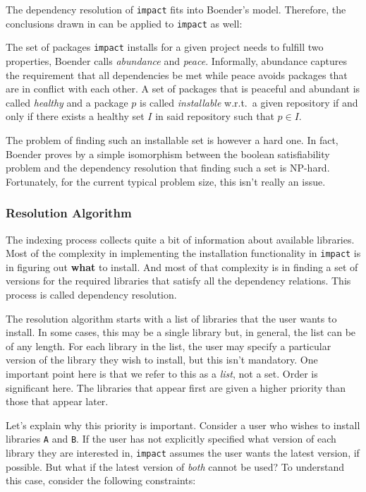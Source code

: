 \documentclass[11pt,a4paper,twocolumn]{article}
\newcommand{\code}[1]{\texttt{#1}} %
\begin{document}
The dependency resolution of \code{impact} fits into Boender's model.
Therefore, the conclusions drawn in \parencite{boender2011formal} can be
applied to \code{impact} as well:

The set of packages \code{impact} installs for a given project needs to
fulfill two properties, Boender calls \emph{abundance} and \emph{peace}.
Informally, abundance captures the requirement that all dependencies
be met while peace avoids packages that are in conflict with each
other.  A set of packages that is peaceful and abundant is called
\emph{healthy} and a package $p$ is called \emph{installable} w.r.t.\ a
given repository if and only if there exists a healthy set $I$ in said
repository such that $p \in I$.

The problem of finding such an installable set is however a hard one.
In fact, Boender proves by a simple isomorphism between the boolean
satisfiability problem and the dependency resolution that finding such
a set is NP-hard.  Fortunately, for the current typical problem size,
this isn't really an issue.

\subsubsection{Resolution Algorithm}
\label{sec:algorithm}

The indexing process collects quite a bit of information about
available libraries.  Most of the complexity in implementing the
installation functionality in \code{impact} is in figuring out
\textbf{what} to install.  And most of that complexity is in finding a set
of versions for the required libraries that satisfy all the dependency
relations.  This process is called dependency resolution.

The resolution algorithm starts with a list of libraries that the user
wants to install.  In some cases, this may be a single library but, in
general, the list can be of any length.  For each library in the list,
the user may specify a particular version of the library they wish to
install, but this isn't mandatory.  One important point here is that
we refer to this as a \emph{list}, not a set.  Order is significant
here.  The libraries that appear first are given a higher priority
than those that appear later.

Let's explain why this priority is important.  Consider a user who
wishes to install libraries \code{A} and \code{B}.  If the user has
not explicitly specified what version of each library they are
interested in, \code{impact} assumes the user wants the latest
version, if possible.  But what if the latest version of \emph{both}
cannot be used?  To understand this case, consider the following
constraints:
\end{document}
